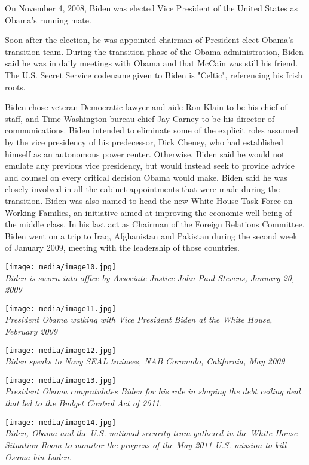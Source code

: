 On November 4, 2008, Biden was elected Vice President of the United
States as Obama's running mate.

Soon after the election, he was appointed chairman of President-elect
Obama's transition team. During the transition phase of the Obama
administration, Biden said he was in daily meetings with Obama and that
McCain was still his friend. The U.S. Secret Service codename given to
Biden is "Celtic", referencing his Irish roots.

Biden chose veteran Democratic lawyer and aide Ron Klain to be his chief
of staff, and Time Washington bureau chief Jay Carney to be his director
of communications. Biden intended to eliminate some of the explicit
roles assumed by the vice presidency of his predecessor, Dick Cheney,
who had established himself as an autonomous power center. Otherwise,
Biden said he would not emulate any previous vice presidency, but would
instead seek to provide advice and counsel on every critical decision
Obama would make. Biden said he was closely involved in all the cabinet
appointments that were made during the transition. Biden was also named
to head the new White House Task Force on Working Families, an
initiative aimed at improving the economic well being of the middle
class. In his last act as Chairman of the Foreign Relations Committee,
Biden went on a trip to Iraq, Afghanistan and Pakistan during the second
week of January 2009, meeting with the leadership of those countries.

\texttt{[image: media/image10.jpg]}\\
\emph{Biden is sworn into office by Associate Justice John Paul Stevens,
January 20, 2009}

\texttt{[image: media/image11.jpg]}\\
\emph{President Obama walking with Vice President Biden at the White
House, February 2009}

\texttt{[image: media/image12.jpg]}\\
\emph{Biden speaks to Navy SEAL trainees, NAB Coronado, California, May
2009}

\texttt{[image: media/image13.jpg]}\\
\emph{President Obama congratulates Biden for his role in shaping the
debt ceiling deal that led to the Budget Control Act of 2011.}

\texttt{[image: media/image14.jpg]}\\
\emph{Biden, Obama and the U.S. national security team gathered in the
White House Situation Room to monitor the progress of the May 2011 U.S.
mission to kill Osama bin Laden.}

